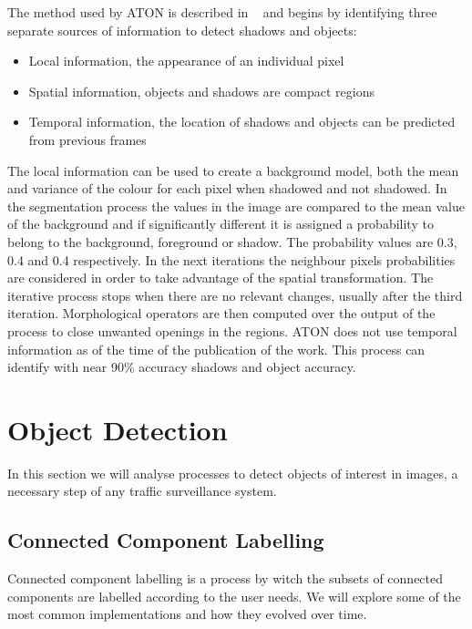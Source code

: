 The method used by ATON is described in ~\cite{mikic_moving_2000} and begins by identifying three separate sources of information to detect shadows and objects:
\begin{itemize}
	\item Local information, the appearance of an individual pixel
	\item Spatial information, objects and shadows are compact regions
	\item Temporal information, the location of shadows and objects can be predicted from previous frames
\end{itemize}

The local information can be used to create a background model, both the mean and variance of the colour for each pixel when shadowed and not shadowed. In the segmentation process the values in the image are compared to the mean value of the background and if significantly different it is assigned a probability to belong to the background, foreground or shadow. The probability values are 0.3, 0.4 and 0.4 respectively. In the next iterations the neighbour pixels probabilities are considered in order to take advantage of the spatial transformation. The iterative process stops when there are no relevant changes, usually after the third iteration. Morphological operators are then computed over the output of the process to close unwanted openings in the regions. ATON does not use temporal information as of the time of the publication of the work. This process can identify with near 90\% accuracy shadows and object accuracy.


\section{Object Detection}

In this section we will analyse processes to detect objects of interest in images, a necessary step of any traffic surveillance system.


\subsection{Connected Component Labelling}

Connected component labelling is a process by witch the subsets of connected components are labelled according to the user needs. We will explore some of the most common implementations and how they evolved over time.

